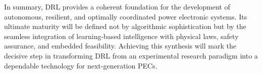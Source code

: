 In summary, DRL provides a coherent foundation for the development of autonomous, resilient, and optimally coordinated power electronic systems. Its ultimate maturity will be defined not by algorithmic sophistication but by the seamless integration of learning-based intelligence with physical laws, safety assurance, and embedded feasibility. Achieving this synthesis will mark the decisive step in transforming DRL from an experimental research paradigm into a dependable technology for next-generation PECs.
